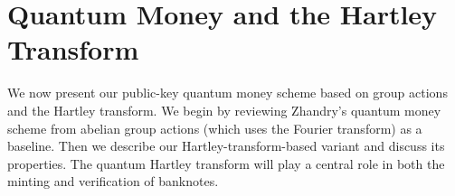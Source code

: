 \documentclass[11pt]{article}
\theoremstyle{definition}
\begin{document}



\chapter{Quantum Money and the Hartley Transform}
We now present our public-key quantum money scheme based on group actions and the Hartley transform. We begin by reviewing Zhandry’s quantum money scheme from abelian group actions (which uses the Fourier transform) as a baseline. Then we describe our Hartley-transform-based variant and discuss its properties. The quantum Hartley transform will play a central role in both the minting and verification of banknotes.
\end{document}
